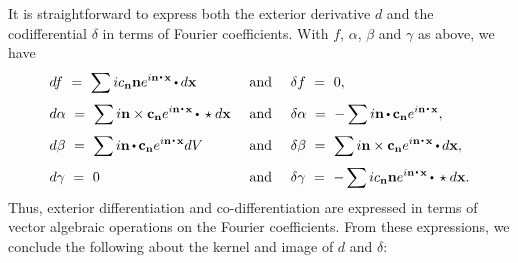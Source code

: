 It is straightforward to express both the exterior derivative $d$ and the
codifferential $\delta$ in terms of Fourier coefficients. With $f$, $\alpha$,
$\beta$ and $\gamma$ as above, we have
$$
\begin{array}{lll}
\displaystyle{df \ = \ \sum ic_{\n}\n e^{i\n\dte\x}\dt d\x} &
\mbox{\rm\ and\ } & \delta f \ = \ 0,\\[0.3cm]
\displaystyle{d\alpha \ = \ \sum i\n\times \c_\n e^{i\n\dte\x}\dt \star d\x} &
\mbox{\rm\ and\ } & \displaystyle{\delta\alpha \ = \ -\sum i\n\dt \c_\n e^{i\n\dte\x}},\\[0.3cm]
\displaystyle{d\beta \ = \ \sum i\n\dt\c_\n e^{i\n\dte\x}dV} &
\mbox{\rm\ and\ } & \displaystyle{\delta\beta \ = \ \sum i\n\times\c_\n e^{i\n\dte\x}
\dt d\x,}\\[0.3cm]
d\gamma \ = \ 0 & \mbox{\rm\ and\ } & 
\displaystyle{\delta\gamma \ = \ -\sum ic_\n \n e^{i\n\dte\x}\dt\star d\x}.
\end{array}
$$
Thus, exterior differentiation and co-differentiation are expressed in terms of vector algebraic operations on the Fourier coefficients.
From these expressions, we conclude the following about the kernel and image
of $d$ and $\delta$:

